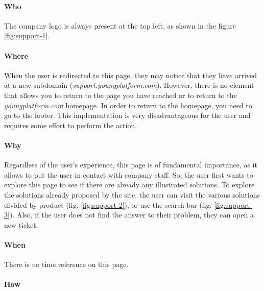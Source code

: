 \paragraph{Who}

The company logo is always present at the top left, as shown in the figure 
\ref{fig:support-1}.

\paragraph{Where}

When the user is redirected to this page, they may notice that they have 
arrived at a new subdomain (\textit{support.youngplatform.com}). However, 
there is no element that allows you to return to the page you have reached 
or to return to the \textit{youngplatform.com} homepage. In order to return 
to the homepage, you need to go to the footer. This implementation is very 
disadvantageous for the user and requires some effort to perform the action.

\paragraph{Why}

Regardless of the user's experience, this page is of fundamental 
importance, as it allows to put the user in contact with company 
staff. So, the user first wants to explore this page to see if there are 
already any illustrated solutions. To explore the solutions already 
proposed by the site, the user can visit the various solutions divided 
by product (fig. \ref{fig:support-2}), or use the search bar (fig. 
\ref{fig:support-3}). Also, if the user does not find the answer to their 
problem, they can open a new ticket.

\paragraph{When}

There is no time reference on this page.

\paragraph{How}

